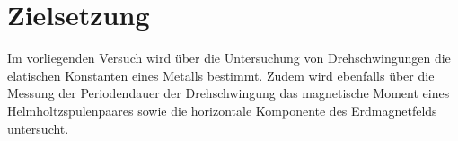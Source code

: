 \section{Zielsetzung}
\label{sec:Zielsetzung}
Im vorliegenden Versuch wird über die Untersuchung von Drehschwingungen die elatischen Konstanten eines Metalls bestimmt.
Zudem wird ebenfalls über die Messung der Periodendauer der Drehschwingung das magnetische Moment eines Helmholtzspulenpaares sowie die horizontale Komponente des Erdmagnetfelds untersucht.
